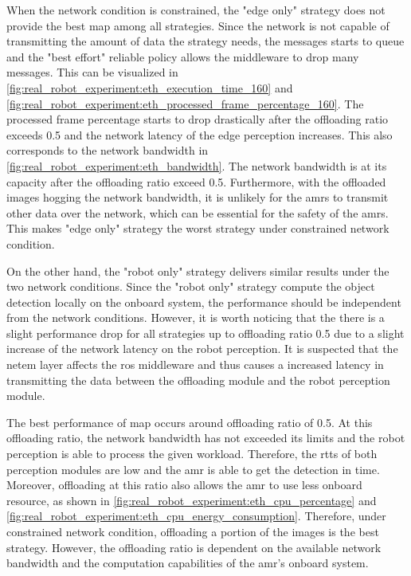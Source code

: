 When the network condition is constrained, the "edge only" strategy does not provide the best \gls{map} among all strategies. Since the network is not capable of transmitting the amount of data the strategy needs, the messages starts to queue and the "best effort" reliable policy allows the middleware to drop many messages. This can be visualized in \cref{fig:real_robot_experiment:eth_execution_time_160} and \cref{fig:real_robot_experiment:eth_processed_frame_percentage_160}. The processed frame percentage starts to drop drastically after the offloading ratio exceeds 0.5 and the network latency of the edge perception increases. This also corresponds to the network bandwidth in \cref{fig:real_robot_experiment:eth_bandwidth}. The network bandwidth is at its capacity after the offloading ratio exceed 0.5. Furthermore, with the offloaded images hogging the network bandwidth, it is unlikely for the \glspl{amr} to transmit other data over the network, which can be essential for the safety of the \glspl{amr}. This makes "edge only" strategy the worst strategy under constrained network condition. 

On the other hand, the "robot only" strategy delivers similar results under the two network conditions. Since the "robot only" strategy compute the object detection locally on the onboard system, the performance should be independent from the network conditions. However, it is worth noticing that the there is a slight performance drop for all strategies up to offloading ratio 0.5 due to a slight increase of the network latency on the robot perception. It is suspected that the \gls{netem} layer affects the \gls{ros} middleware and thus causes a increased latency in transmitting the data between the offloading module and the robot perception module. 

The best performance of \gls{map} occurs around offloading ratio of 0.5. At this offloading ratio, the network bandwidth has not exceeded its limits and the robot perception is able to process the given workload. Therefore, the \glspl{rtt} of both perception modules are low and the \gls{amr} is able to get the detection in time. Moreover, offloading at this ratio also allows the \gls{amr} to use less onboard resource, as shown in \cref{fig:real_robot_experiment:eth_cpu_percentage} and \cref{fig:real_robot_experiment:eth_cpu_energy_consumption}. Therefore, under constrained network condition, offloading a portion of the images is the best strategy. However, the offloading ratio is dependent on the available network bandwidth and the computation capabilities of the \gls{amr}'s onboard system.

